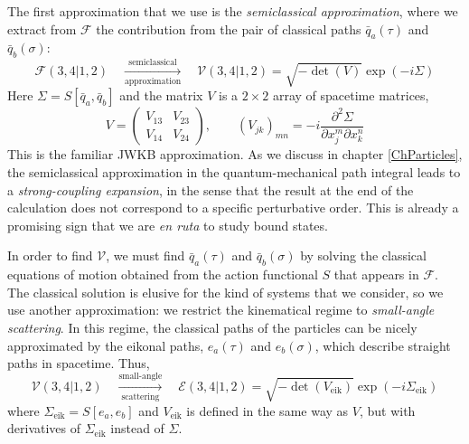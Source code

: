 The first approximation that we use is the \textit{semiclassical approximation}, where we extract from $\mathcal{F}$ the contribution from the pair of classical paths $\bar{q}_{a}(\tau)$ and $\bar{q}_{b}(\sigma)$:
\begin{equation}
	\mathcal{F}(3,4|1,2) \quad \xrightarrow[\text{approximation}]{\text{semiclassical}} \quad \mathcal{V}(3,4|1,2) = \sqrt{-\det{(V)}} \exp{\left(-i \Sigma \right)}
\end{equation}
Here $\Sigma = S[ \bar{q}_{a}, \bar{q}_{b} ]$ and the matrix $V$ is a $2 \times 2$ array of spacetime matrices,
\begin{equation}
	V = \begin{pmatrix}
	V_{13} & V_{23} \\
	V_{14} & V_{24}
	\end{pmatrix}, \qquad (V_{jk})_{mn} = -i \frac{\partial^{2} \Sigma}{\partial x_{j}^{m} \partial x_{k}^{n}}
\end{equation}
This is the familiar JWKB approximation. As we discuss in chapter \ref{ChParticles}, the semiclassical approximation in the quantum-mechanical path integral leads to a \textit{strong-coupling expansion}, in the sense that the result at the end of the calculation does not correspond to a specific perturbative order. This is already a promising sign that we are \textit{en ruta} to study bound states.

In order to find $\mathcal{V}$, we must find $\bar{q}_{a}(\tau)$ and $\bar{q}_{b}(\sigma)$ by solving the classical equations of motion obtained from the action functional $S$ that appears in $\mathcal{F}$. The classical solution is elusive for the kind of systems that we consider, so we use another approximation: we restrict the kinematical regime to \textit{small-angle scattering}. In this regime, the classical paths of the particles can be nicely approximated by the eikonal paths, $e_{a}(\tau)$ and $e_{b}(\sigma)$, which describe straight paths in spacetime. Thus,
\begin{equation}
	\mathcal{V}(3,4|1,2) \quad \xrightarrow[\text{scattering}]{\text{small-angle}} \quad \mathcal{E}(3,4|1,2) = \sqrt{-\det{(V_{\text{eik}})}} \exp{\left(-i \Sigma_{\text{eik}} \right)}
\end{equation}
where $\Sigma_{\text{eik}} = S[ e_{a}, e_{b} ]$ and $V_{\text{eik}}$ is defined in the same way as $V$, but with derivatives of $\Sigma_{\text{eik}}$ instead of $\Sigma$.

